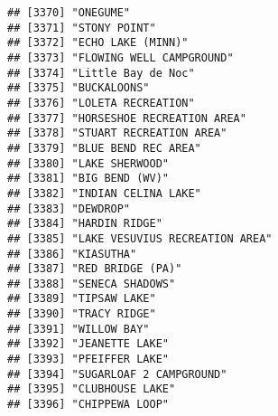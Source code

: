 \documentclass[
]{article}
\begin{document}
\begin{verbatim}
## [3370] "ONEGUME"                                                                             
## [3371] "STONY POINT"                                                                         
## [3372] "ECHO LAKE (MINN)"                                                                    
## [3373] "FLOWING WELL CAMPGROUND"                                                             
## [3374] "Little Bay de Noc"                                                                   
## [3375] "BUCKALOONS"                                                                          
## [3376] "LOLETA RECREATION"                                                                   
## [3377] "HORSESHOE RECREATION AREA"                                                           
## [3378] "STUART RECREATION AREA"                                                              
## [3379] "BLUE BEND REC AREA"                                                                  
## [3380] "LAKE SHERWOOD"                                                                       
## [3381] "BIG BEND (WV)"                                                                       
## [3382] "INDIAN CELINA LAKE"                                                                  
## [3383] "DEWDROP"                                                                             
## [3384] "HARDIN RIDGE"                                                                        
## [3385] "LAKE VESUVIUS RECREATION AREA"                                                       
## [3386] "KIASUTHA"                                                                            
## [3387] "RED BRIDGE (PA)"                                                                     
## [3388] "SENECA SHADOWS"                                                                      
## [3389] "TIPSAW LAKE"                                                                         
## [3390] "TRACY RIDGE"                                                                         
## [3391] "WILLOW BAY"                                                                          
## [3392] "JEANETTE LAKE"                                                                       
## [3393] "PFEIFFER LAKE"                                                                       
## [3394] "SUGARLOAF 2 CAMPGROUND"                                                              
## [3395] "CLUBHOUSE LAKE"                                                                      
## [3396] "CHIPPEWA LOOP"                                                                       

\end{verbatim}
\end{document}

